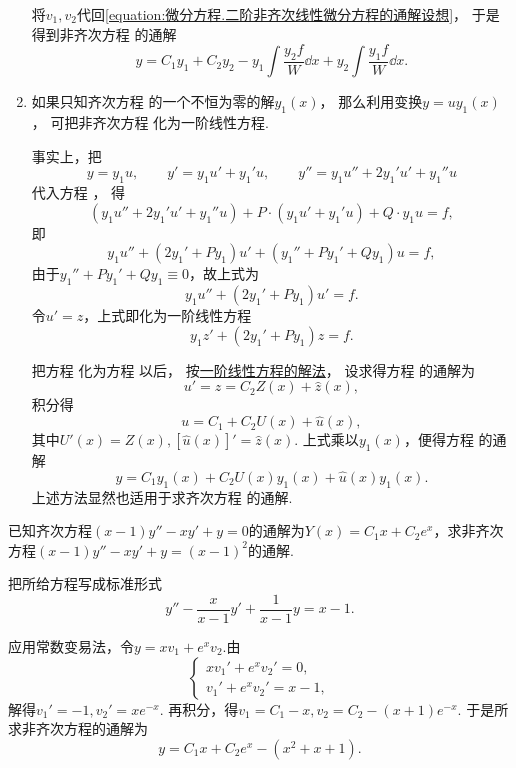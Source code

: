 \begin{enumerate}
将\(v_1,v_2\)代回\cref{equation:微分方程.二阶非齐次线性微分方程的通解设想}，
于是得到非齐次方程  的通解
\begin{equation}\label{equation:微分方程.二阶非齐次线性微分方程的通解.形式1}
	y = C_1 y_1 + C_2 y_2
	- y_1 \int \frac{y_2 f}{W} \dd{x}
	+ y_2 \int \frac{y_1 f}{W} \dd{x}.
\end{equation}

\item%
如果只知齐次方程 
的一个不恒为零的解\(y_1(x)\)，
那么利用变换\(y = u y_1(x)\)，
可把非齐次方程 
化为一阶线性方程.

事实上，把\[
	y = y_1 u, \qquad y' = y_1 u' + y_1' u, \qquad y'' = y_1 u'' + 2 y_1' u' + y_1'' u
\]
代入方程 ，
得\[
	(y_1 u'' + 2y_1' u' + y_1'' u) + P\cdot(y_1 u' + y_1' u) + Q \cdot y_1 u = f,
\]
即\[
	y_1 u'' + (2y_1' + P y_1) u' + (y_1'' + P y_1' + Q y_1) u = f,
\]
由于\(y_1'' + P y_1' + Q y_1 \equiv 0\)，故上式为\[
	y_1 u'' + (2 y_1' + P y_1) u' = f.
\]
令\(u' = z\)，上式即化为一阶线性方程
\begin{equation}\label{equation:微分方程.降为一阶的二阶线性微分方程}
	y_1 z' + (2 y_1' + P y_1) z = f.
\end{equation}

把方程 
化为方程  以后，
按\hyperref[section:微分方程.一阶线性微分方程]{一阶线性方程的解法}，
设求得方程  的通解为\[
	u' = z = C_2 Z(x) + \hat{z}(x),
\]
积分得\[
	u = C_1 + C_2 U(x) + \hat{u}(x),
\]
其中\(U'(x) = Z(x), [\hat{u}(x)]' = \hat{z}(x)\).
上式乘以\(y_1(x)\)，便得方程  的通解
\begin{equation}\label{equation:微分方程.二阶非齐次线性微分方程的通解.形式2}
	y = C_1 y_1(x) + C_2 U(x) y_1(x) + \hat{u}(x) y_1(x).
\end{equation}
上述方法显然也适用于求齐次方程  的通解.
\end{enumerate}

\begin{example}
已知齐次方程\((x-1)y'' - xy' + y = 0\)的通解为\(Y(x) = C_1 x + C_2 e^x\)，求非齐次方程\((x-1)y'' - xy' + y = (x-1)^2\)的通解.
\begin{solution}
把所给方程写成标准形式\[
y'' - \frac{x}{x-1} y' + \frac{1}{x-1} y = x-1.
\]

应用常数变易法，令\(y = x v_1 + e^x v_2\).由\[
\left\{ \begin{array}{l}
x v_1' + e^x v_2' = 0, \\
v_1' + e^x v_2' = x-1,
\end{array} \right.
\]解得\(v_1' = -1, v_2' = x e^{-x}\).
再积分，得\(v_1 = C_1 - x, v_2 = C_2 - (x+1) e^{-x}\).
于是所求非齐次方程的通解为\[
y = C_1 x + C_2 e^x - (x^2+x+1).
\]
\end{solution}
\end{example}

